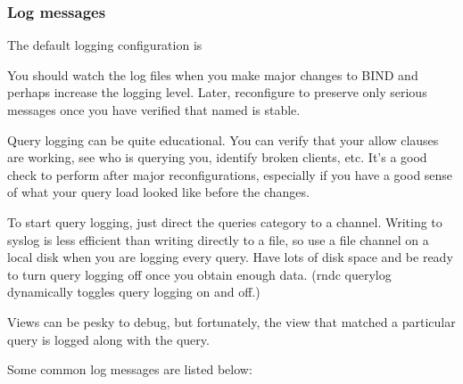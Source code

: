 
\subsubsection[Log
messages]{\texorpdfstring{\protect\hypertarget{part0024_split_070.htmlux5cux23_idTextAnchor961}{}{}Log
messages}{Log messages}}

The default logging configuration is


You should watch the log files when you make major changes to BIND and
perhaps increase the logging level. Later, reconfigure to preserve only
serious messages once you have verified that {named} is stable.

Query logging can be quite educational. You can verify that your {allow}
clauses are working, see who is querying you, identify broken clients,
etc. It's a good check to perform after major reconfigurations,
especially if you have a good sense of what your query load looked like
before the changes.

To start query logging, just direct the {queries} category to a channel.
Writing to syslog is less efficient than writing directly to a file, so
use a file channel on a local disk when you are logging every query.
Have lots of disk space and be ready to turn query logging off once you
obtain enough data. ({rndc querylog} dynamically toggles query logging
on and off.)

Views can be pesky to debug, but fortunately, the view that matched a
particular query is logged along with the query.

Some common log messages are listed below:

